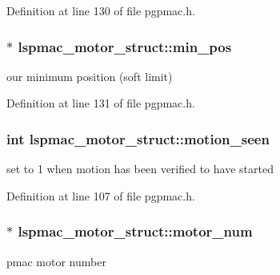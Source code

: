 Definition at line 130 of file pgpmac.\-h.

\hypertarget{structlspmac__motor__struct_a7c1f2f67c64d26b12d6bb0d681797d8d}{
\subsubsection[{min\-\_\-pos}]{$\ast$ lspmac\-\_\-motor\-\_\-struct\-::min\-\_\-pos}}\label{structlspmac__motor__struct_a7c1f2f67c64d26b12d6bb0d681797d8d}


our minimum position (soft limit) 



Definition at line 131 of file pgpmac.\-h.

\hypertarget{structlspmac__motor__struct_a68c471836f52707fa8582f7860cf500f}{
\subsubsection[{motion\-\_\-seen}]{\setlength{\rightskip}{0pt plus 5cm}int lspmac\-\_\-motor\-\_\-struct\-::motion\-\_\-seen}}\label{structlspmac__motor__struct_a68c471836f52707fa8582f7860cf500f}


set to 1 when motion has been verified to have started 



Definition at line 107 of file pgpmac.\-h.

\hypertarget{structlspmac__motor__struct_ad6a51cca3c7e5f79168e5c33fd9e736b}{
\subsubsection[{motor\-\_\-num}]{$\ast$ lspmac\-\_\-motor\-\_\-struct\-::motor\-\_\-num}}\label{structlspmac__motor__struct_ad6a51cca3c7e5f79168e5c33fd9e736b}


pmac motor number 



